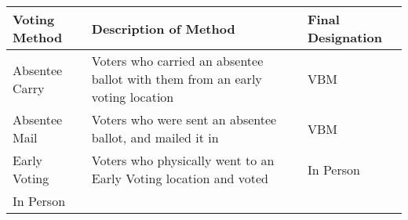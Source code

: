 \documentclass[12pt,twoside]{reedthesis}
\begin{document}
  \begin{longtable}[]{@{}lll@{}}
  \toprule
  \begin{minipage}[b]{0.13\columnwidth}\raggedright\strut
  Voting Method\strut
  \end{minipage} & \begin{minipage}[b]{0.63\columnwidth}\raggedright\strut
  Description of Method\strut
  \end{minipage} & \begin{minipage}[b]{0.15\columnwidth}\raggedright\strut
  Final Designation\strut
  \end{minipage}\tabularnewline
  \midrule
  \endhead
  \begin{minipage}[t]{0.13\columnwidth}\raggedright\strut
  Absentee Carry\strut
  \end{minipage} & \begin{minipage}[t]{0.63\columnwidth}\raggedright\strut
  Voters who carried an absentee ballot with them from an early voting
  location\strut
  \end{minipage} & \begin{minipage}[t]{0.15\columnwidth}\raggedright\strut
  VBM\strut
  \end{minipage}\tabularnewline
  \begin{minipage}[t]{0.13\columnwidth}\raggedright\strut
  Absentee Mail\strut
  \end{minipage} & \begin{minipage}[t]{0.63\columnwidth}\raggedright\strut
  Voters who were sent an absentee ballot, and mailed it in\strut
  \end{minipage} & \begin{minipage}[t]{0.15\columnwidth}\raggedright\strut
  VBM\strut
  \end{minipage}\tabularnewline
  \begin{minipage}[t]{0.13\columnwidth}\raggedright\strut
  Early Voting\strut
  \end{minipage} & \begin{minipage}[t]{0.63\columnwidth}\raggedright\strut
  Voters who physically went to an Early Voting location and voted\strut
  \end{minipage} & \begin{minipage}[t]{0.15\columnwidth}\raggedright\strut
  In Person\strut
  \end{minipage}\tabularnewline
  \begin{minipage}[t]{0.13\columnwidth}\raggedright\strut
  In Person\strut
  \end{minipage} & \begin{minipage}[t]{0.63\columnwidth}\raggedright\strut

\end{minipage}
\end{longtable}
\end{document}
